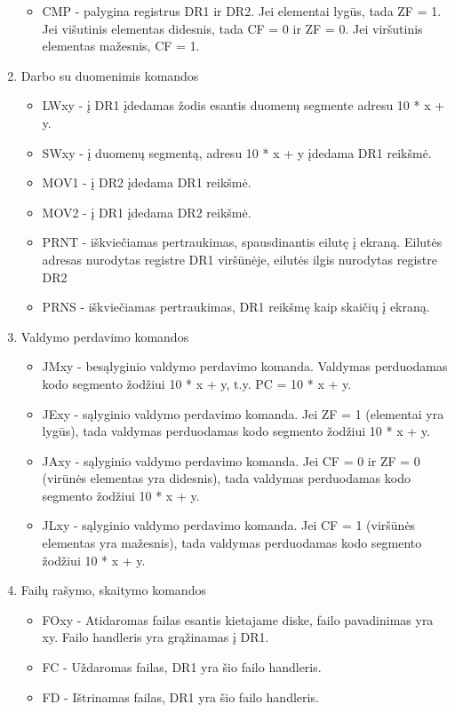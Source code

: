 \begin{enumerate}
		\begin{itemize}
		\item CMP - palygina registrus DR1 ir DR2. Jei elementai lygūs, tada ZF = 1. Jei višutinis elementas didesnis, tada CF = 0 ir  ZF = 0. Jei viršutinis elementas mažesnis, CF = 1.
		\end{itemize}
	\item Darbo su duomenimis komandos
		\begin{itemize}
		\item LWxy - į DR1 įdedamas žodis esantis duomenų segmente adresu 10 * x + y.
		\item SWxy - į duomenų segmentą, adresu 10 * x + y įdedama DR1 reikšmė.
		\item MOV1 - į DR2 įdedama DR1 reikšmė.
		\item MOV2 - į DR1 įdedama DR2 reikšmė.
		\item PRNT - iškviečiamas pertraukimas, spausdinantis eilutę į ekraną. Eilutės adresas nurodytas registre DR1 viršūnėje, eilutės ilgis nurodytas registre DR2
		\item PRNS - iškviečiamas pertraukimas, DR1 reikšmę kaip skaičių į ekraną.
		\end{itemize}
	\item Valdymo perdavimo komandos
		\begin{itemize}
		\item JMxy - besąlyginio valdymo perdavimo komanda. Valdymas perduodamas kodo segmento žodžiui 10 * x + y, t.y. PC = 10 * x + y.
		\item JExy - sąlyginio valdymo perdavimo komanda. Jei ZF = 1 (elementai yra lygūs), tada valdymas perduodamas kodo segmento žodžiui 10 * x + y.
		\item JAxy - sąlyginio valdymo perdavimo komanda. Jei CF = 0 ir ZF = 0 (virūnės elementas yra didesnis), tada valdymas perduodamas kodo segmento žodžiui 10 * x + y.
		\item JLxy  - sąlyginio valdymo perdavimo komanda. Jei CF = 1 (viršūnės elementas yra mažesnis), tada valdymas perduodamas kodo segmento žodžiui 10 * x + y.
		\end{itemize}
	\item Failų rašymo, skaitymo komandos
		\begin{itemize}
		\item FOxy - Atidaromas failas esantis kietajame diske, failo pavadinimas yra xy. Failo handleris yra grąžinamas į DR1.
		\item FC - Uždaromas failas, DR1 yra šio failo handleris.
		\item FD - Ištrinamas failas, DR1 yra šio failo handleris.

\end{itemize}
\end{enumerate}
